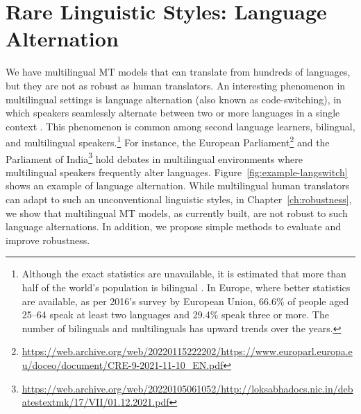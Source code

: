 \section*{Rare Linguistic Styles: Language Alternation}
We have multilingual MT models that can translate from hundreds of languages, but they are not as robust as human translators.
An interesting phenomenon in multilingual settings is language alternation (also known as code-switching), in which speakers seamlessly alternate between two or more languages in a single context \cite{cms-and-ury-1977-biling}. 
This phenomenon is common among second language learners, bilingual, and multilingual speakers.\footnote{Although the exact statistics are unavailable, it is estimated that more than half of the world's population is bilingual \cite{grosjean-2010-bilingual}. 
In Europe, where better statistics are available, as per 2016's survey by European Union, 66.6\% of people aged 25–64 speak at least two languages and 29.4\% speak three or more. The number of bilinguals and multilinguals has upward trends over the years.} 
For instance, the European Parliament\footnote{\url{https://web.archive.org/web/20220115222202/https://www.europarl.europa.eu/doceo/document/CRE-9-2021-11-10_EN.pdf}}
and the Parliament of India\footnote{\url{https://web.archive.org/web/20220105061052/http://loksabhadocs.nic.in/debatestextmk/17/VII/01.12.2021.pdf}} hold debates in multilingual environments where multilingual speakers frequently alter languages. 
Figure~\ref{fig:example-langswitch} shows an example of language alternation.
While multilingual human translators can adapt to such an unconventional linguistic styles, in Chapter~\ref{ch:robustness}, we show that multilingual MT models, as currently built, are not robust to such language alternations. In addition, we propose simple methods to evaluate and improve robustness.

